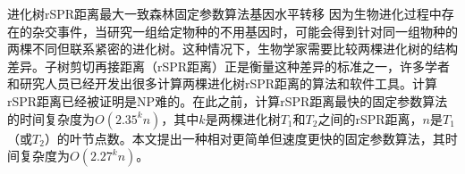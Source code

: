 
\begin{Cabstract}{进化树}{rSPR距离}{最大一致森林}{固定参数算法}{基因水平转移}
因为生物进化过程中存在的杂交事件，当研究一组给定物种的不用基因时，可能会得到针对同一组物种的两棵不同但联系紧密的进化树。这种情况下，生物学家需要比较两棵进化树的结构差异。子树剪切再接距离（rSPR距离）正是衡量这种差异的标准之一，许多学者和研究人员已经开发出很多计算两棵进化树rSPR距离的算法和软件工具。计算rSPR距离已经被证明是NP难的。在此之前，计算rSPR距离最快的固定参数算法的时间复杂度为$O(2.35^kn)$，其中$k$是两棵进化树$T_1$和$T_2$之间的rSPR距离，$n$是$T_1$（或$T_2$）的叶节点数。本文提出一种相对更简单但速度更快的固定参数算法，其时间复杂度为$O(2.27^kn)$。
\end{Cabstract}
